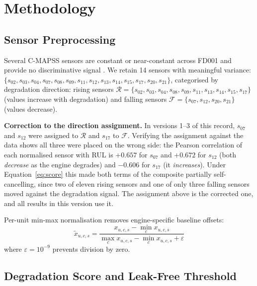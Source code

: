 \documentclass[10pt,twocolumn]{article}
\begin{document}
\section{Methodology}
\label{sec:method}

\subsection{Sensor Preprocessing}

Several C-MAPSS sensors are constant or near-constant across FD001 and provide no
discriminative signal \cite{ramasso2014application}.
We retain 14 sensors with meaningful variance:
$\{s_{02},s_{03},s_{04},s_{07},s_{08},s_{09},s_{11},s_{12},s_{13},s_{14},s_{15},s_{17},s_{20},s_{21}\}$,
categorised by degradation direction:
rising sensors
$\mathcal{R}=\{s_{02},s_{03},s_{04},s_{08},s_{09},s_{11},s_{13},s_{14},s_{15},s_{17}\}$
(values increase with degradation)
and falling sensors $\mathcal{F}=\{s_{07},s_{12},s_{20},s_{21}\}$ (values decrease).

\label{sec:sensors}
\textbf{Correction to the direction assignment.} In versions 1--3 of this record,
$s_{07}$ and $s_{12}$ were assigned to $\mathcal{R}$ and $s_{17}$ to $\mathcal{F}$.
Verifying the assignment against the data shows all three were placed on the wrong
side: the Pearson correlation of each normalised sensor with RUL is $+0.657$ for
$s_{07}$ and $+0.672$ for $s_{12}$ (both \emph{decrease} as the engine degrades) and
$-0.606$ for $s_{17}$ (it \emph{increases}). Under Equation~\ref{eq:score} this made
both terms of the composite partially self-cancelling, since two of eleven rising
sensors and one of only three falling sensors moved against the degradation signal.
The assignment above is the corrected one, and all results in this version use it.

Per-unit min-max normalisation removes engine-specific baseline offsets:
\begin{equation}
  \tilde{x}_{u,c,s}=
  \frac{x_{u,c,s}-\min_c x_{u,c,s}}
       {\max_c x_{u,c,s}-\min_c x_{u,c,s}+\varepsilon}
\end{equation}
where $\varepsilon=10^{-9}$ prevents division by zero.

\subsection{Degradation Score and Leak-Free Threshold}
\end{document}
